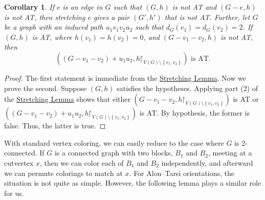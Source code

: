 \documentclass[12pt]{article}
\theoremstyle{plain}
\newtheorem{cor}[thm]{Corollary}
\theoremstyle{definition}
\theoremstyle{remark}
\newcommand{\set}[1]{\left\{ #1 \right\}}
\newcommand{\parens}[1]{\left( #1 \right)}
\renewcommand{\restriction}{\mathord{\upharpoonright}}
\begin{document}
	\begin{cor}
		\label{SubdivideConstructor}
		\label{ReduceP4Cor}
		If $e$ is an edge in $G$ such that $(G,h)$ is not AT and $(G-e, h)$ is not AT,
		then stretching $e$ gives a pair $(G',h')$ that is not AT.  Further,
		let $G$ be a graph with an induced path $u_1v_1v_2u_2$ such that $d_G(v_1) =
		d_G(v_2) = 2$.  If $(G,h)$ is AT, where $h(v_1) = h(v_2) = 0$, and
		$(G-v_1-v_2,h)$ is not AT, then \[\parens{(G - v_1 - v_2) + u_1u_2,
			h\restriction_{V(G) \setminus \set{v_1, v_2}}} \text{ is AT.}\]
	\end{cor}
	\begin{proof}
		The first statement is immediate from the \hyperlink{target:SubdivideTwice}{Stretching Lemma}.  Now we prove the second.  Suppose $(G,h)$ satisfies the
		hypotheses.  Applying part (2) of the \hyperlink{target:SubdivideTwice}{Stretching Lemma}
		shows that either $\parens{G - v_1 - v_2, h\restriction_{V(G) \setminus
				\set{v_1, v_2}}}$ is AT or $\parens{(G - v_1 - v_2) + u_1u_2,
			h\restriction_{V(G) \setminus \set{v_1, v_2}}}$ is AT. 
		By hypothesis, the former is false.  Thus, the latter is true.
	\end{proof}
	
	With standard vertex coloring, we can easily reduce to the case where $G$ is
	2-connected.  If $G$ is a connected graph with two blocks, $B_1$ and $B_2$,
	meeting at a cutvertex $x$, then we can color each of $B_1$ and $B_2$
	independently, and afterward we can permute colorings to match at $x$.
	For Alon--Tarsi orientations, the situation is not quite as simple.  However,
	the following lemma plays a similar role for us.
	
\end{document}
